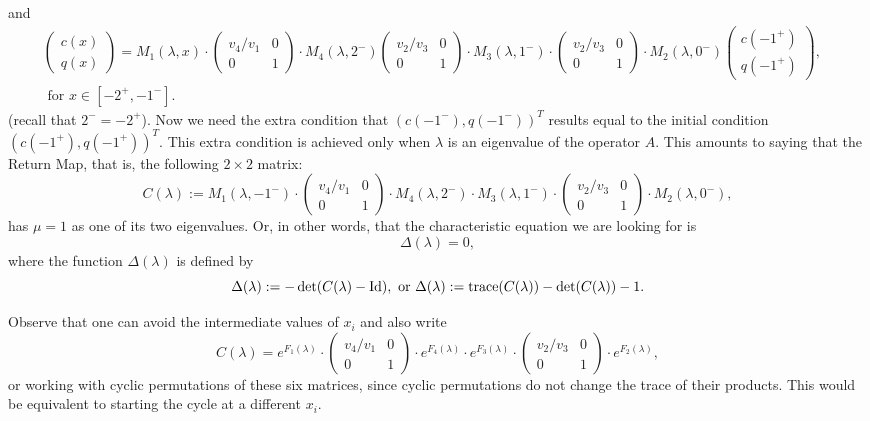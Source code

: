 \documentclass[a4paper]{article}
\numberwithin{equation}{section}
\begin{document}
and
\begin{align*}
\begin{pmatrix}
c(x)\\q(x)
\end{pmatrix}=M_1(\lambda,x)\cdot\begin{pmatrix} v_4/v_1&0\\0&1\end{pmatrix}\cdot M_4(\lambda, 2^-)\begin{pmatrix} v_2/v_3&0\\0&1\end{pmatrix} \cdot M_3(\lambda,1^-)\cdot\begin{pmatrix} v_2/v_3&0\\0&1\end{pmatrix}\cdot M_2(\lambda,0^-)\begin{pmatrix}
c(-1^+)\\q(-1^+)
\end{pmatrix},& \\
\textrm{ for } x\in[-2^+,-1^-].&
\end{align*}
(recall that $2^-=-2^+$). Now we need the extra condition that $(c(-1^-),q(-1^-))^T$ results equal to the initial condition $(c(-1^+),q(-1^+))^T$. This extra condition is achieved only when $\lambda$ is an eigenvalue of the operator $A$. This amounts to saying that the Return Map, that is, the following $2\times 2$ matrix:
\begin{equation}\label{eq:C}
C(\lambda):= M_1(\lambda,-1^-)\cdot
\begin{pmatrix} v_4/v_1&0\\0&1\end{pmatrix}\cdot M_4 (\lambda, 2^-)\cdot M_3(\lambda, 1^-)\cdot
\begin{pmatrix} v_2/v_3&0\\0&1\end{pmatrix}\cdot M_2 (\lambda,0^-),
\end{equation}
has $\mu=1$ as one of its two eigenvalues.
Or, in other words, that the characteristic equation we are looking for is $$\Delta(\lambda)=0,$$
where the function $\Delta(\lambda)$ is defined by
\begin{equation}\label{eq:f}
\Delta(\lambda):=-\det(C(\lambda)-{\rm{Id}}), \text{ or }\Delta(\lambda):={\rm trace}(C(\lambda))-\det(C(\lambda))-1.
\end{equation}

Observe that one can avoid the intermediate values of $x_i$ and also write
\begin{equation}\label{simpleC}
C(\lambda)= e^{F_1(\lambda)}\cdot
\begin{pmatrix} v_4/v_1&0\\0&1\end{pmatrix}\cdot e^{F_4(\lambda)}\cdot e^{F_3(\lambda)}\cdot
\begin{pmatrix} v_2/v_3&0\\0&1\end{pmatrix}\cdot e^{F_2(\lambda)},
\end{equation}
or working with cyclic permutations of these six matrices, since cyclic permutations do not change the trace of their products. This would be equivalent to starting the cycle at a different $x_i$.
\end{document}
